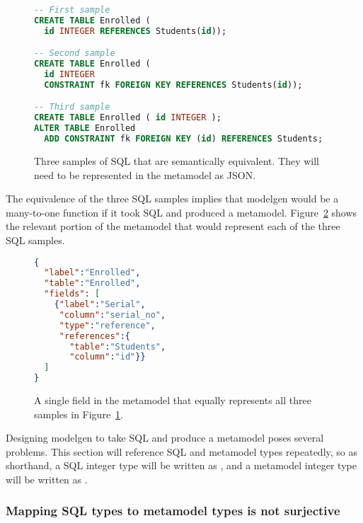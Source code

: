 \begin{figure}[h!]
\begin{lstlisting}[language=sql]
-- First sample
CREATE TABLE Enrolled (
  id INTEGER REFERENCES Students(id));

-- Second sample
CREATE TABLE Enrolled (
  id INTEGER
  CONSTRAINT fk FOREIGN KEY REFERENCES Students(id));

-- Third sample
CREATE TABLE Enrolled ( id INTEGER );
ALTER TABLE Enrolled
  ADD CONSTRAINT fk FOREIGN KEY (id) REFERENCES Students;
\end{lstlisting}
\caption{Three samples of SQL that are semantically equivalent. They will need
to be represented in the metamodel as JSON.}
\label{fig:metamodel_sql}
\end{figure}

The equivalence of the three SQL samples implies that modelgen would be a
many-to-one function if it took SQL and produced a metamodel.
Figure~\ref{fig:metamodel_json_convert1} shows the relevant portion of the
metamodel that would represent each of the three SQL samples.

\begin{figure}[h!]
\begin{lstlisting}[language=json]
{
  "label":"Enrolled",
  "table":"Enrolled",
  "fields": [
    {"label":"Serial",
     "column":"serial_no",
     "type":"reference",
     "references":{
       "table":"Students",
       "column":"id"}}
  ]
}
\end{lstlisting}
\caption{A single field in the metamodel that equally represents all three
samples in Figure~\ref{fig:metamodel_sql}.}
\label{fig:metamodel_json_convert1}
\end{figure}

Designing modelgen to take SQL and produce a metamodel poses several problems.
This section will reference SQL and metamodel types repeatedly, so as shorthand,
a SQL integer type will be written as , and a metamodel integer
type will be written as .


\subsubsection{Mapping SQL types to metamodel types is not surjective}
\label{sec:metamodel_issue1}

